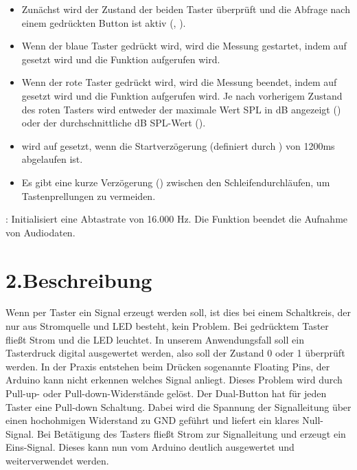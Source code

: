 \begin{itemize}
    \item Zunächst wird der Zustand der beiden Taster überprüft und die Abfrage nach einem gedrückten Button ist aktiv (, ).
    \item Wenn der blaue Taster gedrückt wird, wird die Messung gestartet, indem  auf  gesetzt wird und die Funktion  aufgerufen wird.
    \item Wenn der rote Taster gedrückt wird, wird die Messung beendet, indem  auf  gesetzt wird und die Funktion  aufgerufen wird. Je nach vorherigem Zustand des roten Tasters wird entweder der maximale Wert SPL in dB angezeigt () oder der durchschnittliche dB SPL-Wert ().
    \item {} wird auf  gesetzt, wenn die Startverzögerung (definiert durch ) von 1200ms abgelaufen ist.
    \item Es gibt eine kurze Verzögerung () zwischen den Schleifendurchläufen, um Tastenprellungen zu vermeiden.
\end{itemize} 


: Initialisiert eine Abtastrate von 16.000 Hz.
Die Funktion  beendet die Aufnahme von Audiodaten.



\section{2.Beschreibung}

Wenn per Taster ein Signal erzeugt werden soll, ist dies bei einem Schaltkreis, der nur aus Stromquelle und \ac{LED} besteht, kein Problem. Bei gedrücktem Taster fließt Strom und die \ac{LED} leuchtet. In unserem Anwendungsfall soll ein Tasterdruck digital ausgewertet werden, also soll der Zustand 0 oder 1 überprüft werden. In der Praxis entstehen beim Drücken sogenannte Floating Pins, der Arduino kann nicht erkennen welches Signal anliegt. Dieses Problem wird durch Pull-up- oder Pull-down-Widerstände gelöst. Der Dual-Button hat für jeden Taster eine Pull-down Schaltung. Dabei wird die Spannung der Signalleitung über einen hochohmigen Widerstand zu GND geführt und liefert ein klares Null-Signal. Bei Betätigung des Tasters fließt Strom zur Signalleitung und erzeugt ein Eins-Signal. Dieses kann nun vom Arduino deutlich ausgewertet und weiterverwendet werden.



